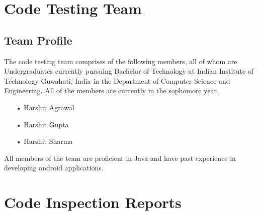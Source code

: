 \documentclass{scrreprt}
\begin{document}
\chapter{Code Testing Team}
\section{Team Profile}
The code testing team comprises of the following members, all of whom are
Undergraduates currently pursuing Bachelor of Technology at Indian Institute of Technology
Guwahati, India in the Department of Computer Science and Engineering. All of the members
are currently in the sophomore year.
\begin{itemize}
\item[•] Harshit Agrawal 
\item[•] Harshit Gupta
\item[•] Harshit Sharma
\end{itemize}
All members of the team are proficient in Java and have past experience in developing android applications.

\chapter{Code Inspection Reports}
\end{document}
